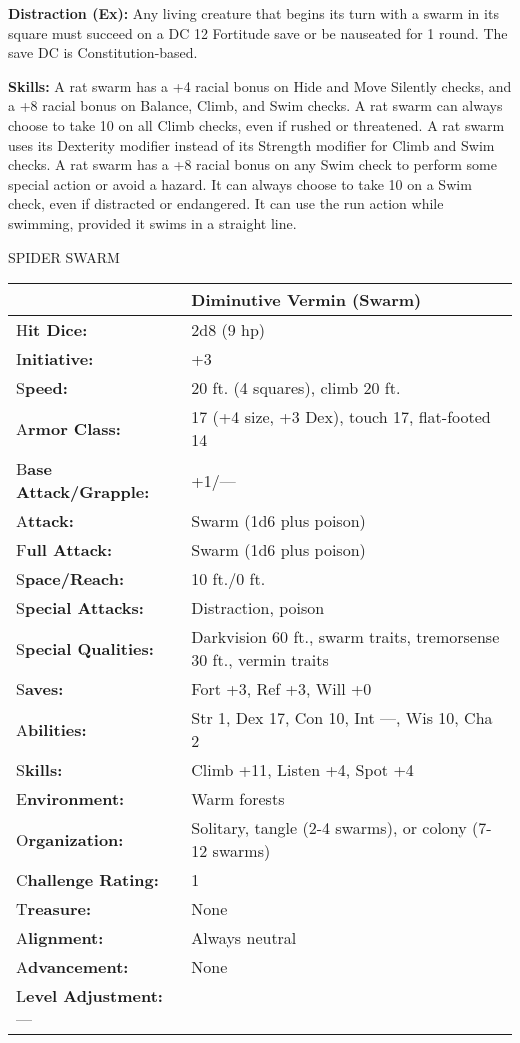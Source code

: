 \documentclass{article}
\begin{document}
\textbf{Distraction (Ex):} Any living creature that begins its turn with a swarm 
in its square must succeed on a DC 12 Fortitude save or be nauseated for 1 round. 
The save DC is Constitution-based.

\textbf{Skills: }A rat swarm has a +4 racial bonus on Hide and Move Silently checks, 
and a +8 racial bonus on Balance, Climb, and Swim checks. A rat swarm can always 
choose to take 10 on all Climb checks, even if rushed or threatened. A rat swarm 
uses its Dexterity modifier instead of its Strength modifier for Climb and Swim 
checks. A rat swarm has a +8 racial bonus on any Swim check to perform some special 
action or avoid a hazard. It can always choose to take 10 on a Swim check, even 
if distracted or endangered. It can use the run action while swimming, provided 
it swims in a straight line.

\vspace{12pt}
SPIDER SWARM

\begin{tabular}{|>{\raggedright}p{86pt}|>{\raggedright}p{239pt}|}
\hline
  & Diminutive Vermin (Swarm)\tabularnewline
\hline
H\textbf{it Dice:} & 2d8 (9 hp)\tabularnewline
\hline
I\textbf{nitiative:} & +3\tabularnewline
\hline
S\textbf{peed:} & 20 ft. (4 squares), climb 20 ft.\tabularnewline
\hline
A\textbf{rmor Class:} & 17 (+4 size, +3 Dex), touch 17, flat-footed 14\tabularnewline
\hline
B\textbf{ase Attack/Grapple:} & +1/---\tabularnewline
\hline
A\textbf{ttack:} & Swarm (1d6 plus poison)\tabularnewline
\hline
F\textbf{ull Attack:} & Swarm (1d6 plus poison)\tabularnewline
\hline
S\textbf{pace/Reach:} & 10 ft./0 ft.\tabularnewline
\hline
S\textbf{pecial Attacks:} & Distraction, poison\tabularnewline
\hline
S\textbf{pecial Qualities:} & Darkvision 60 ft., swarm traits, tremorsense 30 ft., 
vermin traits\tabularnewline
\hline
S\textbf{aves:} & Fort +3, Ref +3, Will +0\tabularnewline
\hline
A\textbf{bilities:} & Str 1, Dex 17, Con 10, Int ---, Wis 10, Cha 2\tabularnewline
\hline
S\textbf{kills:} & Climb +11, Listen +4, Spot +4\tabularnewline
\hline
E\textbf{nvironment:} & Warm forests\tabularnewline
\hline
O\textbf{rganization:} & Solitary, tangle (2-4 swarms), or colony (7-12 swarms)\tabularnewline
\hline
C\textbf{hallenge Rating:} & 1\tabularnewline
\hline
T\textbf{reasure:} & None\tabularnewline
\hline
A\textbf{lignment:} & Always neutral\tabularnewline
\hline
A\textbf{dvancement:} & None\tabularnewline
\hline
L\textbf{evel Adjustment:}--- & \tabularnewline
\hline
\end{tabular}
\end{document}
